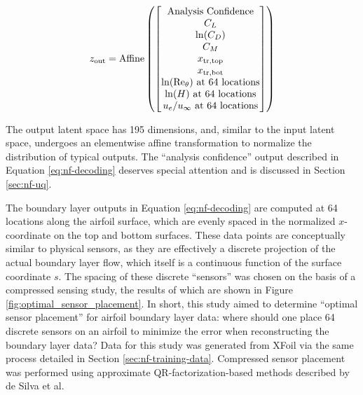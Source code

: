     \begin{equation}
        z_{\rm out} = \text{Affine}\left( \begin{bmatrix}
                                              \text{Analysis Confidence}               \\
                                              C_L                                      \\
                                              \ln(C_D)                                 \\
                                              C_M                                      \\
                                              x_{\rm tr, top}                          \\
                                              x_{\rm tr, bot}                          \\
                                              \ln(\rm Re_\theta) \text{ at 64 locations} \\
                                              \ln(H) \text{ at 64 locations}           \\
                                              u_e/u_\infty \text{ at 64 locations}     \\
        \end{bmatrix} \right)
        \label{eq:nf-decoding}
    \end{equation}

    The output latent space has 195 dimensions, and, similar to the input latent space, undergoes an elementwise affine transformation to normalize the distribution of typical outputs. The ``analysis confidence'' output described in Equation \ref{eq:nf-decoding} deserves special attention and is discussed in Section \ref{sec:nf-uq}.

    The boundary layer outputs in Equation \ref{eq:nf-decoding} are computed at 64 locations along the airfoil surface, which are evenly spaced in the normalized $x$-coordinate on the top and bottom surfaces. These data points are conceptually similar to physical sensors, as they are effectively a discrete projection of the actual boundary layer flow, which itself is a continuous function of the surface coordinate $s$. The spacing of these discrete ``sensors'' was chosen on the basis of a compressed sensing study, the results of which are shown in Figure \ref{fig:optimal_sensor_placement}. In short, this study aimed to determine ``optimal sensor placement'' for airfoil boundary layer data: where should one place 64 discrete sensors on an airfoil to minimize the error when reconstructing the boundary layer data? Data for this study was generated from XFoil via the same process detailed in Section \ref{sec:nf-training-data}. Compressed sensor placement was performed using approximate QR-factorization-based methods described by de Silva et al. \cite{de_Silva2021}

